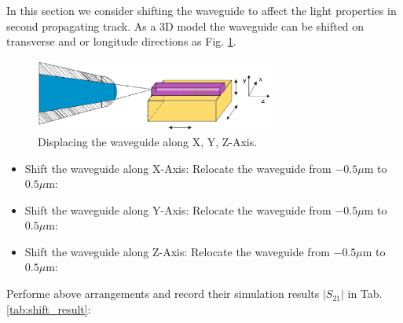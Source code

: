 
In this section we consider shifting the waveguide to affect the light properties in second propagating track. As a 3D model the waveguide can be shifted on transverse and or longitude directions as Fig. \ref{fig:shift_all_axis}.
\begin{figure}[!ht]
\centering
\includegraphics[width=0.7\textwidth]{bilder/shift_all_axis}
\caption{Displacing the waveguide along X, Y, Z-Axis.}
\label{fig:shift_all_axis}
\end{figure}

\begin{itemize}
\item Shift the waveguide along X-Axis: Relocate the waveguide from $-0.5\mu$m to $0.5\mu$m:
\item Shift the waveguide along Y-Axis: Relocate the waveguide from $-0.5\mu$m to $0.5\mu$m:
\item Shift the waveguide along Z-Axis: Relocate the waveguide from $-0.5\mu$m to $0.5\mu$m:
\end{itemize}
Performe above arrangements and record their simulation results $|S_{21}|$ in Tab. \ref{tab:shift_result}:\\

